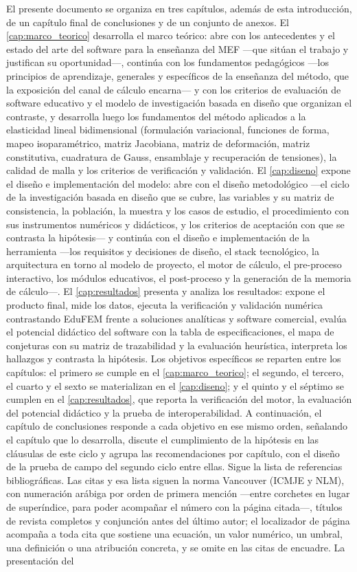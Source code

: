 El presente documento se organiza en tres capítulos, además de esta introducción, de un capítulo final de conclusiones y de un conjunto de anexos. El \autoref{cap:marco_teorico} desarrolla el marco teórico: abre con los antecedentes y el estado del arte del software para la enseñanza del MEF —que sitúan el trabajo y justifican su oportunidad—, continúa con los fundamentos pedagógicos —los principios de aprendizaje, generales y específicos de la enseñanza del método, que la exposición del canal de cálculo encarna— y con los criterios de evaluación de software educativo y el modelo de investigación basada en diseño que organizan el contraste, y desarrolla luego los fundamentos del método aplicados a la elasticidad lineal bidimensional (formulación variacional, funciones de forma, mapeo isoparamétrico, matriz Jacobiana, matriz de deformación, matriz constitutiva, cuadratura de Gauss, ensamblaje y recuperación de tensiones), la calidad de malla y los criterios de verificación y validación. El \autoref{cap:diseno} expone el diseño e implementación del modelo: abre con el diseño metodológico —el ciclo de la investigación basada en diseño que se cubre, las variables y su matriz de consistencia, la población, la muestra y los casos de estudio, el procedimiento con sus instrumentos numéricos y didácticos, y los criterios de aceptación con que se contrasta la hipótesis— y continúa con el diseño e implementación de la herramienta —los requisitos y decisiones de diseño, el stack tecnológico, la arquitectura en torno al modelo de proyecto, el motor de cálculo, el pre-proceso interactivo, los módulos educativos, el post-proceso y la generación de la memoria de cálculo—. El \autoref{cap:resultados} presenta y analiza los resultados: expone el producto final, mide los datos, ejecuta la verificación y validación numérica contrastando EduFEM frente a soluciones analíticas y software comercial, evalúa el potencial didáctico del software con la tabla de especificaciones, el mapa de conjeturas con su matriz de trazabilidad y la evaluación heurística, interpreta los hallazgos y contrasta la hipótesis. Los objetivos específicos se reparten entre los capítulos: el primero se cumple en el \autoref{cap:marco_teorico}; el segundo, el tercero, el cuarto y el sexto se materializan en el \autoref{cap:diseno}; y el quinto y el séptimo se cumplen en el \autoref{cap:resultados}, que reporta la verificación del motor, la evaluación del potencial didáctico y la prueba de interoperabilidad. A continuación, el capítulo de conclusiones responde a cada objetivo en ese mismo orden, señalando el capítulo que lo desarrolla, discute el cumplimiento de la hipótesis en las cláusulas de este ciclo y agrupa las recomendaciones por capítulo, con el diseño de la prueba de campo del segundo ciclo entre ellas. Sigue la lista de referencias bibliográficas. Las citas y esa lista siguen la norma Vancouver (ICMJE y NLM), con numeración arábiga por orden de primera mención —entre corchetes en lugar de superíndice, para poder acompañar el número con la página citada—, títulos de revista completos y conjunción antes del último autor; el localizador de página acompaña a toda cita que sostiene una ecuación, un valor numérico, un umbral, una definición o una atribución concreta, y se omite en las citas de encuadre. La presentación del 